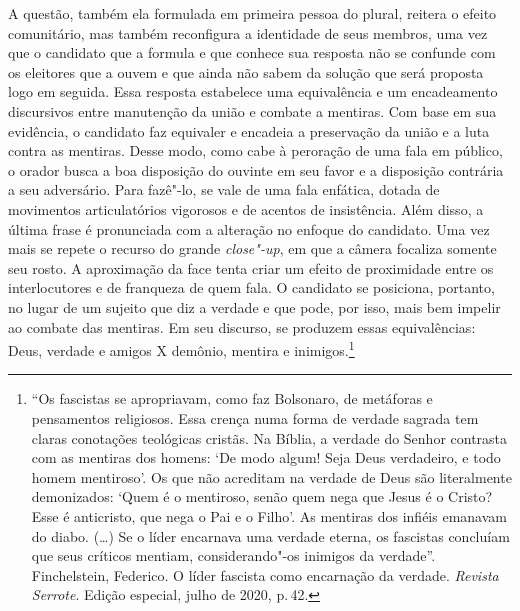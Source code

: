 A questão, também ela formulada em primeira pessoa do plural, reitera o
efeito comunitário, mas também reconfigura a identidade de seus membros,
uma vez que o candidato que a formula e que conhece sua resposta não se
confunde com os eleitores que a ouvem e que ainda não sabem da solução
que será proposta logo em seguida. Essa resposta estabelece uma
equivalência e um encadeamento discursivos entre manutenção da união e
combate a mentiras. Com base em sua evidência, o candidato faz equivaler
e encadeia a preservação da união e a luta contra as mentiras. Desse
modo, como cabe à peroração de uma fala em público, o orador busca a boa
disposição do ouvinte em seu favor e a disposição contrária a seu
adversário. Para fazê"-lo, se vale de uma fala enfática, dotada de
movimentos articulatórios vigorosos e de acentos de insistência. Além
disso, a última frase é pronunciada com a alteração no enfoque do
candidato. Uma vez mais se repete o recurso do grande \emph{close"-up},
em que a câmera focaliza somente seu rosto. A aproximação da face tenta
criar um efeito de proximidade entre os interlocutores e de franqueza de
quem fala. O candidato se posiciona, portanto, no lugar de um sujeito
que diz a verdade e que pode, por isso, mais bem impelir ao combate das
mentiras. Em seu discurso, se produzem essas equivalências: Deus,
verdade e amigos X demônio, mentira e inimigos.\footnote{``Os fascistas
  se apropriavam, como faz Bolsonaro, de metáforas e pensamentos
  religiosos. Essa crença numa forma de verdade sagrada tem claras
  conotações teológicas cristãs. Na Bíblia, a verdade do Senhor
  contrasta com as mentiras dos homens: `De modo algum! Seja Deus
  verdadeiro, e todo homem mentiroso'. Os que não acreditam na verdade
  de Deus são literalmente demonizados: `Quem é o mentiroso, senão quem
  nega que Jesus é o Cristo? Esse é anticristo, que nega o Pai e o
  Filho'. As mentiras dos infiéis emanavam do diabo. (\ldots{}) Se o líder
  encarnava uma verdade eterna, os fascistas concluíam que seus críticos
  mentiam, considerando"-os inimigos da verdade''. Finchelstein,
  Federico. O líder fascista como encarnação da verdade. \emph{Revista
  Serrote}. Edição especial, julho de 2020, p.\,42.}

